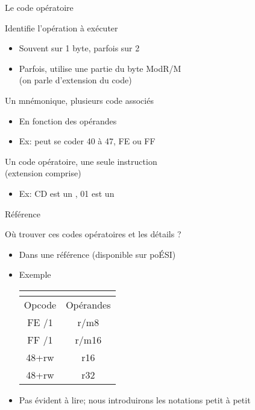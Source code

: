 \documentclass[14pt,xcolor,table]{beamer}
\begin{document}
\begin{frame}[fragile]{Le code opératoire}

	Identifie l'opération à exécuter
	\begin{itemize}
	\item Souvent sur 1 byte, parfois sur 2
	\item Parfois, utilise une partie du byte ModR/M
		\\(on parle d'extension du code)
	\end{itemize}

	\medskip
	Un mnémonique, plusieurs code associés
	\begin{itemize}
	\item En fonction des opérandes
	\item Ex:  peut se coder 40 à 47, FE ou FF
	\end{itemize}

	\medskip
	Un code opératoire, une seule instruction
	\\(extension comprise)
	\begin{itemize}
	\item Ex: CD est un , 01 est un 
	\end{itemize}
	
\end{frame}

\begin{frame}[fragile]{Référence}

	Où trouver ces codes opératoires et les détails ?
	\begin{itemize}
	\item Dans une référence (disponible sur poÉSI)
	\item Exemple

	\begin{center}
	\begin{footnotesize}
	\begin{tabular}{|c|c|}
		\multicolumn{2}{c}{\asm{DEC}}\\\hline
		{\cellcolor{gray!25}Opcode} & {\cellcolor{gray!25}Opérandes} \\\hline
		FE /1 & r/m8 \\\hline
		FF /1 & r/m16 \\\hline
		48+rw & r16 \\\hline
		48+rw & r32 \\\hline
	\end{tabular}
	\end{footnotesize}
	\end{center}

	\item
		Pas évident à lire; 
		nous introduirons les notations petit à petit
	\end{itemize}
	
\end{frame}
\end{document}
